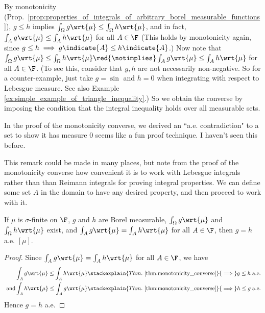 \documentclass{article} %
\newcommand{\dmu}{\wrt{\mu}}
\begin{document}
\begin{remark}{}
 By monotonicity (Prop.~\ref{prop:properties_of_integrals_of_arbitrary_borel_measurable_functions}), $g \leq h$ implies $\int_\Omega g \dmu \leq \int_\Omega h \dmu$, and in fact, $\int_A g \dmu \leq \int_A h \dmu$ for all $A \in \F$ {\tiny (This holds by monotonicity again, since $g \leq h \implies g \indicate{A} \leq h \indicate{A}$.)}  Now note that $\int_\Omega g \dmu \leq \int_\Omega h \dmu  \red{\notimplies} \int_A g \dmu \leq \int_A h \dmu$ for all $A \in \F$. (To see this, consider that $g,h$ are not necessarily non-negative.  So for a counter-example, just take $g=\sin$ and $h=0$ when integrating with respect to Lebesgue measure.  See also Example \ref{ex:simple_example_of_triangle_inequality}.)  So we obtain the converse by imposing the condition that the integral inequality holds over all measurable sets. 	
\end{remark}

\begin{remark}
In the proof of the monotonicity converse, we derived an ``a.e. contradiction" to a set to show it has measure 0 seems like a fun proof technique.  I haven't seen this before. 
\end{remark}

\begin{remark}
This remark could be made in many places, but note from the proof of the monotonicity converse how convenient it is to work with Lebesgue integrals rather than than Reimann integrals for proving integral properties.  We can define some set $A$ in the domain to have any desired property, and then proceed to work with it. 
\end{remark}


\begin{corollary}
If $\mu$ is $\sigma$-finite on $\F$, $g$ and $h$ are Borel measurable, $\int_\Omega g \dmu$ and $\int_\Omega h \dmu$ exist, and $\int_A g \dmu = \int_A h \dmu$ for all $A \in \F$, then $g = h$ a.e. $[\mu]$.
\label{cor:equal_integrals_for_all_measurable_sets_implies_the_functions_are_equal_ae}
\end{corollary}

\begin{proof}
 Since $\int_A g \dmu = \int_A h \dmu$ for all $A \in \F$, we have  
\begin{align*}
\int_A g \dmu \leq \int_A h \dmu 	& \stackexplain{Thm.~\ref{thm:monotonicity_converse}}{\implies} g \leq h \; \text{a.e.} \\
\text{ and} \int_A h \dmu \leq \int_A g \dmu 	& \stackexplain{Thm.~\ref{thm:monotonicity_converse}}{\implies} h \leq g \; \text{a.e.}
\end{align*}
Hence $g=h$ a.e.
\end{proof}
\end{document}
